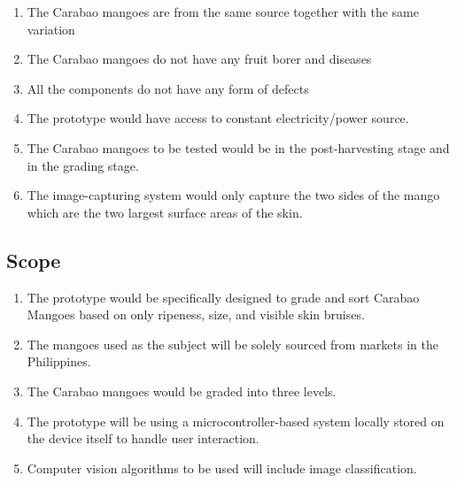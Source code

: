 \begin{enumerate}
	\item The Carabao mangoes are from the same source together with the same variation
	
	\item The Carabao mangoes do not have any fruit borer and diseases
	
	\item All the components do not have any form of defects
	\item The prototype would have access to constant electricity/power source.
	\item The Carabao mangoes to be tested would be in the post-harvesting stage and in the grading stage.
	\item The image-capturing system would only capture the two sides of the mango which 
	are the two largest surface areas of the skin.	
\end{enumerate}

\subsection{Scope}
\begin{enumerate}
	\item The prototype would be specifically designed to grade and 
	sort Carabao Mangoes based on only ripeness, size, and visible skin bruises.
	
	\item The mangoes used as the subject will be solely sourced from markets in the Philippines.
	
	\item The Carabao mangoes would be graded into three levels.
	\item The prototype will be using a microcontroller-based system locally stored on 
	the device itself to handle user interaction.
	\item Computer vision algorithms to be used will include image classification.
\end{enumerate}

